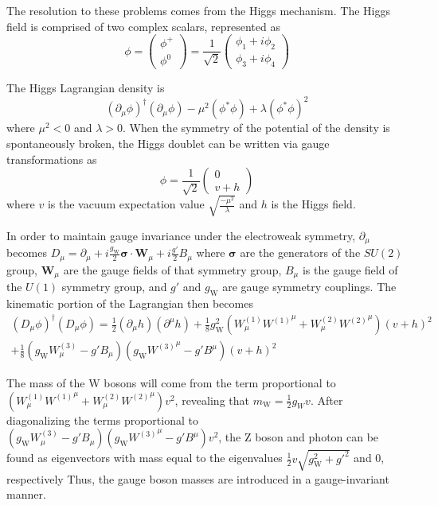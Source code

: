 The resolution to these problems comes from the Higgs mechanism. The Higgs field is comprised of two complex scalars, represented as
\begin{equation}
    \phi = \begin{pmatrix}\phi^+ \\ \phi^0\end{pmatrix} = \frac{1}{\sqrt{2}}\begin{pmatrix}\phi_1+i\phi_2 \\ \phi_3+i\phi_4\end{pmatrix}
    \label{eq:Higgs1}
\end{equation}

The Higgs Lagrangian density is 
\begin{equation}
    (\partial_\mu\phi)^\dagger(\partial_\mu\phi)-\mu^2(\phi^*\phi)+\lambda(\phi^*\phi)^2
\end{equation}
where $\mu^2<0$ and $\lambda > 0$. When the symmetry of the potential of the density is spontaneously broken, the Higgs doublet can be written via gauge transformations as 
\begin{equation}
    \phi =  \frac{1}{\sqrt{2}}\begin{pmatrix}0 \\ v+h\end{pmatrix}
    \label{eq:Higgs2}
\end{equation}
where $v$ is the vacuum expectation value $\sqrt{\frac{-\mu^2}{\lambda}}$ and $h$ is the Higgs field. 

In order to maintain gauge invariance under the electroweak symmetry, $\partial_\mu$ becomes $D_\mu = \partial_\mu+i\frac{g_\mathrm{W}}{2}\boldsymbol{\sigma}\cdot\mathbf{W}_\mu+i\frac{g'}{2}B_\mu$
where $\boldsymbol{\sigma}$ are the generators of the $SU(2)$ group, $\mathbf{W}_\mu$ are the gauge fields of that symmetry group, $B_\mu$ is the gauge field of the $U(1)$ symmetry group, and $g'$ and $g_\mathrm{W}$ are gauge symmetry couplings. The kinematic portion of the Lagrangian then becomes
\begin{multline}
    (D_\mu\phi)^\dagger(D_\mu\phi) = \frac{1}{2}(\partial_\mu h)(\partial^\mu h)+\frac{1}{8}g_\mathrm{W}^2(W_\mu^{(1)}{W^{(1)}}^\mu+ W_\mu^{(2)}{W^{(2)}}^\mu)(v+h)^2 \\
    + \frac{1}{8}(g_\mathrm{W}W_\mu^{(3)}-g'B_\mu)(g_\mathrm{W}{W^{(3)}}^\mu-g'B^\mu)(v+h)^2
\end{multline}

The mass of the W bosons will come from the term proportional to $(W_\mu^{(1)}{W^{(1)}}^\mu+ W_\mu^{(2)}{W^{(2)}}^\mu)v^2$, revealing that $m_\mathrm{W} = \frac{1}{2}g_Wv$. After diagonalizing the terms proportional to $(g_\mathrm{W}W_\mu^{(3)}-g'B_\mu)(g_\mathrm{W}{W^{(3)}}^\mu-g'B^\mu)v^2$, the Z boson and photon can be found as eigenvectors with mass equal to the eigenvalues $\frac{1}{2}v\sqrt{g_\mathrm{W}^2+g'^2}$ and 0, respectively Thus, the gauge boson masses are introduced in a gauge-invariant manner.

